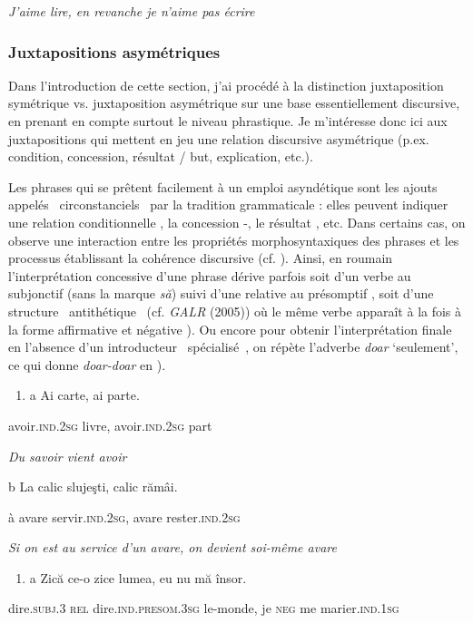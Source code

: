     \textit{J'aime lire, en revanche je n'aime pas écrire}

\subsubsection{Juxtapositions asymétriques}
Dans l'introduction de cette section, j'ai procédé à la distinction juxtaposition symétrique vs. juxtaposition asymétrique sur une base essentiellement discursive, en prenant en compte surtout le niveau phrastique. Je m'intéresse donc ici aux juxtapositions qui mettent en jeu une relation discursive asymétrique (p.ex. condition, concession, résultat / but, explication, etc.). 

Les phrases qui se prêtent facilement à un emploi asyndétique sont les ajouts appelés {\guillemotleft}~circonstanciels~{\guillemotright} par la tradition grammaticale : elles peuvent indiquer une relation conditionnelle , la concession -, le résultat , etc. Dans certains cas, on observe une interaction entre les propriétés morphosyntaxiques des phrases et les processus établissant la cohérence discursive (cf. \citet{Kehler2002}). Ainsi, en roumain l'interprétation concessive d'une phrase dérive parfois soit d'un verbe au subjonctif (sans la marque \textit{să}) suivi d'une relative au présomptif , soit d'une structure {\guillemotleft}~antithétique~{\guillemotright} (cf. \textit{GALR} (2005)) où le même verbe apparaît à la fois à la forme affirmative et négative ). Ou encore pour obtenir l'interprétation finale en l'absence d'un introducteur {\guillemotleft}~spécialisé~{\guillemotright}, on répète l'adverbe \textit{doar} `seulement', ce qui donne \textit{doar-doar} en ).


\begin{enumerate}
\item \label{bkm:Ref273715353}a  Ai  carte,  ai  parte.


\end{enumerate}
avoir.\textsc{ind.2sg}  livre,  avoir.\textsc{ind.2sg}  part

{\itshape
Du savoir vient avoir}

  b  La  calic  slujeşti,  calic  rămâi.

    à  avare  servir.\textsc{ind.2sg},  avare  rester.\textsc{ind.2sg}

    \textit{Si on est au service d'un avare, on devient soi-même avare } 


\begin{enumerate}
\item \label{bkm:Ref268716051}a  Zică  ce-o  zice  lumea,  eu  nu  mă  însor.


\end{enumerate}
dire.\textsc{subj.3  rel}  dire.\textsc{ind.presom.3sg}  le-monde,  je  \textsc{neg } me  marier.\textsc{ind.1sg}

